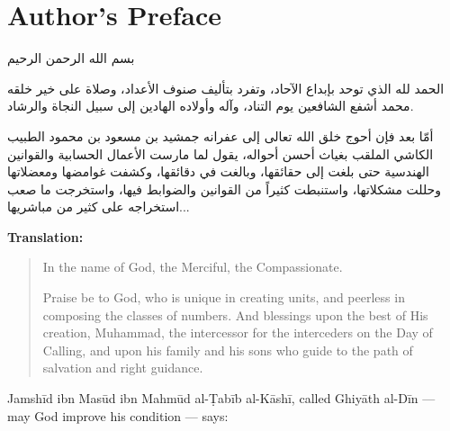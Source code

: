 \documentclass[11pt,a4paper]{article}
\newenvironment{arabicbox}{%
  \begin{framed}
  \begin{minipage}{\dimexpr\linewidth-2\fboxsep-2\fboxrule\relax}
  \setlength{\parindent}{0pt}
  \linespread{1.3}\selectfont
}{%
  \end{minipage}
  \end{framed}
}
\begin{document}
\section*{Author's Preface}

\begin{arabicbox}
\begin{Arabic}
بسم الله الرحمن الرحيم

الحمد لله الذي توحد بإبداع الآحاد، وتفرد بتأليف صنوف الأعداد، وصلاة على خير خلقه محمد أشفع الشافعين يوم التناد، وآله وأولاده الهادين إلى سبيل النجاة والرشاد.

أمّا بعد فإن أحوج خلق الله تعالى إلى عفرانه جمشيد بن مسعود بن محمود الطبيب الكاشي الملقب بغياث أحسن أحواله، يقول لما مارست الأعمال الحسابية والقوانين الهندسية حتى بلغت إلى حقائقها، وبالغت في دقائقها، وكشفت غوامضها ومعضلاتها وحللت مشكلاتها، واستنبطت كثيراً من القوانين والضوابط فيها، واستخرجت ما صعب استخراجه على كثير من مباشريها...
\end{Arabic}
\end{arabicbox}

\vspace{0.5cm}
\noindent\textbf{Translation:}

\begin{quote}
In the name of God, the Merciful, the Compassionate.

Praise be to God, who is unique in creating units, and peerless in
composing the classes of numbers. And blessings upon the best of His
creation, Muhammad, the intercessor for the interceders on the Day of
Calling, and upon his family and his sons who guide to the path of
salvation and right guidance.
\end{quote}

\vspace{0.3cm}
\noindent Jamsh\=id ibn Mas\=ud ibn Mahm\=ud al-\d{T}ab\=ib al-K\=ash\=i, called
Ghiy\=ath al-D\=in --- may God improve his condition --- says:
\end{document}
